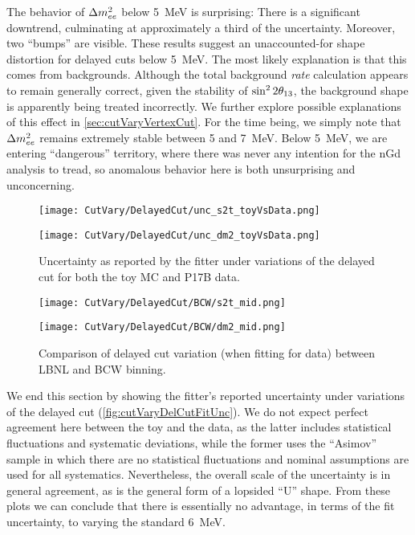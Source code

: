 \documentclass[../thesis.tex]{subfiles}
\begin{document}
The behavior of $\Delta m^2_{ee}$ below 5~MeV is surprising: There is a significant downtrend, culminating at approximately a third of the uncertainty. Moreover, two ``bumps'' are visible. These results suggest an unaccounted-for shape distortion for delayed cuts below 5~MeV. The most likely explanation is that this comes from backgrounds. Although the total background \emph{rate} calculation appears to remain generally correct, given the stability of $\sin^2 2\theta_{13}$, the background shape is apparently being treated incorrectly. We further explore possible explanations of this effect in \autoref{sec:cutVaryVertexCut}. For the time being, we simply note that $\Delta m^2_{ee}$ remains extremely stable between 5 and 7~MeV. Below 5~MeV, we are entering ``dangerous'' territory, where there was never any intention for the nGd analysis to tread, so anomalous behavior here is both unsurprising and unconcerning.

\begin{figure}[ht]
  \begin{minipage}{0.5\linewidth}%
    \texttt{[image: CutVary/DelayedCut/unc\_s2t\_toyVsData.png]}%
  \end{minipage}%
  \begin{minipage}{0.5\linewidth}%
    \texttt{[image: CutVary/DelayedCut/unc\_dm2\_toyVsData.png]}%
  \end{minipage}%
  \caption{Uncertainty as reported by the fitter under variations of the delayed cut for both the toy MC and P17B data.}
  \label{fig:cutVaryDelCutFitUnc}
\end{figure}

\begin{figure}[ht]
  \begin{minipage}{0.5\linewidth}%
    \texttt{[image: CutVary/DelayedCut/BCW/s2t\_mid.png]}%
  \end{minipage}%
  \begin{minipage}{0.5\linewidth}%
    \texttt{[image: CutVary/DelayedCut/BCW/dm2\_mid.png]}%
  \end{minipage}%
  \caption{Comparison of delayed cut variation (when fitting for data) between LBNL and BCW binning.}
  \label{fig:cutVaryDelCutDataResultsBCW}
\end{figure}

We end this section by showing the fitter's reported uncertainty under variations of the delayed cut (\autoref{fig:cutVaryDelCutFitUnc}). We do not expect perfect agreement here between the toy and the data, as the latter includes statistical fluctuations and systematic deviations, while the former uses the ``Asimov'' sample in which there are no statistical fluctuations and nominal assumptions are used for all systematics. Nevertheless, the overall scale of the uncertainty is in general agreement, as is the general form of a lopsided ``U'' shape. From these plots we can conclude that there is essentially no advantage, in terms of the fit uncertainty, to varying the standard 6~MeV.
\end{document}
